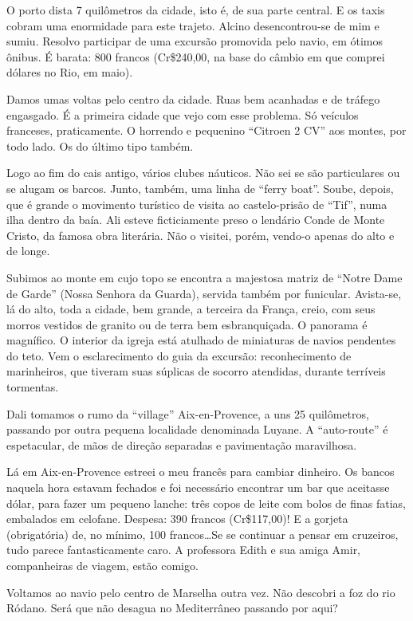 O porto dista 7 quilômetros da cidade, isto é, de sua parte central. E os taxis cobram uma enormidade para este trajeto. Alcino desencontrou-se de mim e sumiu. Resolvo participar de uma excursão promovida pelo navio, em ótimos ônibus. É barata: 800 francos (Cr\$240,00, na base do câmbio em que comprei dólares no Rio, em maio).

Damos umas voltas pelo centro da cidade. Ruas bem acanhadas e de tráfego engasgado. É a primeira cidade que vejo com esse problema. Só veículos franceses, praticamente. O horrendo e pequenino ``Citroen 2 CV'' aos montes, por todo lado. Os do último tipo também.

Logo ao fim do cais antigo, vários clubes náuticos. Não sei se são particulares ou se alugam os barcos. Junto, também, uma linha de ``ferry boat''. Soube, depois, que é grande o movimento turístico de visita ao castelo-prisão de ``Tif'', numa ilha dentro da baía. Ali esteve ficticiamente preso o lendário Conde de Monte Cristo, da famosa obra literária. Não o visitei, porém, vendo-o apenas do alto e de longe.

Subimos ao monte em cujo topo se encontra a majestosa matriz de ``Notre Dame de Garde'' (Nossa Senhora da Guarda), servida também por funicular. Avista-se, lá do alto, toda a cidade, bem grande, a terceira da França, creio, com seus morros vestidos de granito ou de terra bem esbranquiçada. O panorama é magnífico. O interior da igreja está atulhado de miniaturas de navios pendentes do teto. Vem o esclarecimento do guia da excursão: reconhecimento de marinheiros, que tiveram suas súplicas de socorro atendidas, durante terríveis tormentas.

Dali tomamos o rumo da ``village'' Aix-en-Provence, a uns 25 quilômetros, passando por outra pequena localidade denominada Luyane. A ``auto-route'' é espetacular, de mãos de direção separadas e pavimentação maravilhosa.

Lá em Aix-en-Provence estreei o meu francês para cambiar dinheiro. Os bancos naquela hora estavam fechados e foi necessário encontrar um bar que aceitasse dólar, para fazer um pequeno lanche: três copos de leite com bolos de finas fatias, embalados em celofane. Despesa: 390 francos (Cr\$117,00)! E a gorjeta (obrigatória) de, no mínimo, 100 francos\ldots Se se continuar a pensar em cruzeiros, tudo parece fantasticamente caro. A professora Edith e sua amiga Amir, companheiras de viagem, estão comigo.

Voltamos ao navio pelo centro de Marselha outra vez. Não descobri a foz do rio Ródano. Será que não desagua no Mediterrâneo passando por aqui?

